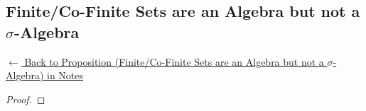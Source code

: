 
\subsection*{Finite/Co-Finite Sets are an Algebra but not a $\sigma$-Algebra}
\label{prf:finite-cocountable-algebra-not-sigma}

\begin{remark*}[Return]
\hyperref[prop:finite-cocountable-algebra-not-sigma]{$\leftarrow$ Back to Proposition (Finite/Co-Finite Sets are an Algebra but not a $\sigma$-Algebra) in Notes}
\end{remark*}

\begin{proof}
\end{proof}

\begin{remark*}

\end{remark*}

\begin{remark*}[Dependencies]

\FlashUses{}
\end{remark*}

